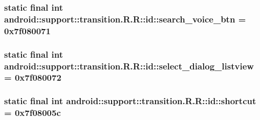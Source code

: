 \hypertarget{classandroid_1_1support_1_1transition_1_1_r_1_1id_9650e37b3fdd4c6aab954d103faf58c3}{
\subsubsection[{search\_\-voice\_\-btn}]{\setlength{\rightskip}{0pt plus 5cm}static final int android::support::transition.R.R::id::search\_\-voice\_\-btn = 0x7f080071}}
\label{classandroid_1_1support_1_1transition_1_1_r_1_1id_9650e37b3fdd4c6aab954d103faf58c3}


\hypertarget{classandroid_1_1support_1_1transition_1_1_r_1_1id_efe9fc3985af692f558a7a18a7f71537}{
\subsubsection[{select\_\-dialog\_\-listview}]{\setlength{\rightskip}{0pt plus 5cm}static final int android::support::transition.R.R::id::select\_\-dialog\_\-listview = 0x7f080072}}
\label{classandroid_1_1support_1_1transition_1_1_r_1_1id_efe9fc3985af692f558a7a18a7f71537}


\hypertarget{classandroid_1_1support_1_1transition_1_1_r_1_1id_af0ccca66a227a14dcb7e8b0c526855f}{
\subsubsection[{shortcut}]{\setlength{\rightskip}{0pt plus 5cm}static final int android::support::transition.R.R::id::shortcut = 0x7f08005c}}
\label{classandroid_1_1support_1_1transition_1_1_r_1_1id_af0ccca66a227a14dcb7e8b0c526855f}


